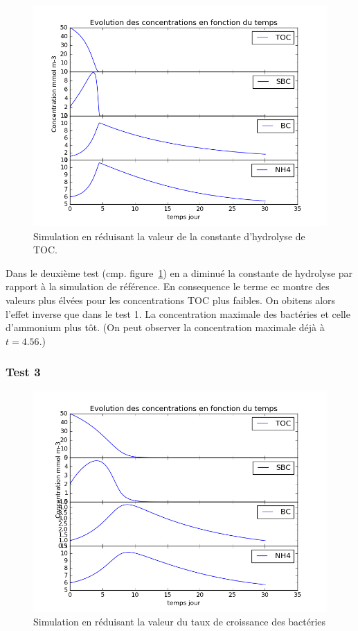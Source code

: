 \begin{figure}[h!]
  \includegraphics[width=\textwidth]{partie1/Test2.png}
  \caption{Simulation en r\'eduisant la valeur de la constante d'hydrolyse de TOC.
  }
  \label{fig:partie1test2}
\end{figure}

\par{
Dans le deuxième test (cmp. figure~\ref{fig:partie1test2}) en a diminué la constante de hydrolyse par rapport à la simulation de référence.
En consequence le terme ec montre des valeurs plus élvées pour les concentrations TOC plus faibles. On obitens
alors l'effet inverse que dans le test 1. La concentration maximale des bactéries et celle d'ammonium plus
tôt. (On peut observer la concentration maximale déjà à $t=4.56$.)
}

\FloatBarrier
\newpage
\subsubsection{Test 3}

\begin{figure}[h!]
  \includegraphics[width=\textwidth]{partie1/Test3.png}
  \caption{Simulation en r\'eduisant la valeur du taux de croissance des bact\'eries
  }
  \label{fig:partie1test3}
\end{figure}


